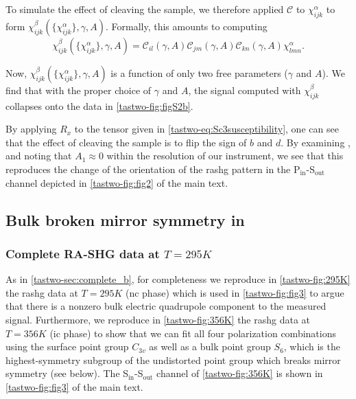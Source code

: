 To simulate the effect of cleaving the sample, we therefore applied $\mathcal{C}$ to $\chi_{ijk}^\alpha$ to form $\chi_{ijk}^\beta(\{\chi_{ijk}^\alpha\}, \gamma, A)$.
Formally, this amounts to computing
\begin{equation}
\label{tastwo-eq:SapplyingC}
\chi_{ijk}^\beta(\{\chi_{ijk}^\alpha\}, \gamma, A) = \mathcal{C}_{il}(\gamma, A)\mathcal{C}_{jm}(\gamma, A)\mathcal{C}_{kn}(\gamma, A)\chi_{lmn}^\alpha.
\end{equation}

Now, $\chi_{ijk}^\beta(\{\chi_{ijk}^\alpha\}, \gamma, A)$ is a function of only two free parameters ($\gamma$ and $A$).
We find that with the proper choice of $\gamma$ and $A$, the signal computed with $\chi_{ijk}^\beta$ collapses onto the data in \cref{tastwo-fig:figS2b}.

By applying $R_x$ to the tensor given in \cref{tastwo-eq:Sc3susceptibility}, one can see that the effect of cleaving the sample is to flip the sign of $b$ and $d$.
By examining , and noting that $A_1\approx 0$ within the resolution of our instrument, we see that this reproduces the change of the orientation of the \gls{rashg} pattern in the P$_\mathrm{in}$-S$_\mathrm{out}$ channel depicted in \cref{tastwo-fig:fig2} of the main text.

\subsection{Bulk broken mirror symmetry in \tastwo} \label{tastwo-sec:Squadrupole}

\subsubsection{Complete RA-SHG data at $T=295K$}

As in \cref{tastwo-sec:complete_b}, for completeness we reproduce in \cref{tastwo-fig:295K} the \gls{rashg} data at $T=295K$ (\gls{nc} phase) which is used in \cref{tastwo-fig:fig3} to argue that there is a nonzero bulk electric quadrupole component to the measured signal.
Furthermore, we reproduce in \cref{tastwo-fig:356K} the \gls{rashg} data at $T=356K$ (\gls{ic} phase) to show that we can fit all four polarization combinations using the surface point group $C_{3v}$ as well as a bulk point group $S_6$, which is the highest-symmetry subgroup of the undistorted point group which breaks mirror symmetry (see below).
The S$_\mathrm{in}$-S$_\mathrm{out}$ channel of \cref{tastwo-fig:356K} is shown in \cref{tastwo-fig:fig3} of the main text.

